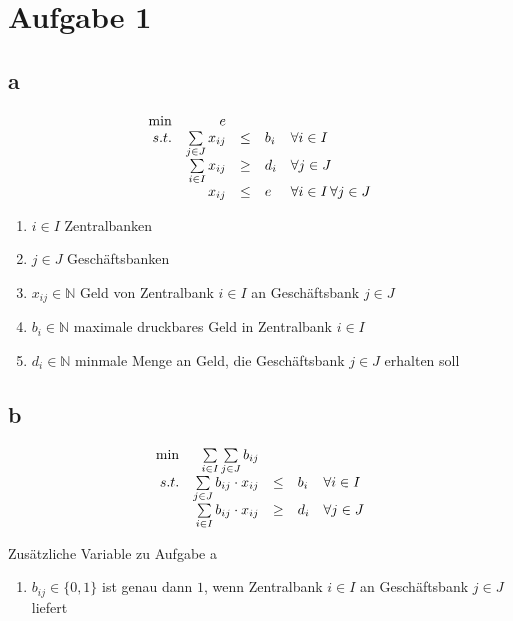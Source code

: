 \documentclass[10pt]{article}
\begin{document}
\section*{Aufgabe 1}
  \subsection*{a}
    \begin{displaymath}
      \begin{array}{ r r c l l}
        \min & e & & & \\
        s.t. & \sum\limits_{j\in J} x_{ij} & \leq & b_i & \forall i\in I \\
             & \sum\limits_{i\in I} x_{ij} & \geq & d_i & \forall j\in J \\
             & x_{ij} & \leq & e & \forall i\in I\, \forall j\in J
      \end{array}
    \end{displaymath}
    \begin{enumerate}
      \item $i\in I$ Zentralbanken
      \item $j\in J$ Geschäftsbanken
      \item $x_{ij}\in \mathbb{N}$ Geld von Zentralbank $i\in I$ 
            an Geschäftsbank $j\in J$
      \item $b_i\in \mathbb{N}$ maximale druckbares Geld in Zentralbank $i\in I$
      \item $d_i\in \mathbb{N}$ minmale Menge an Geld, die Geschäftsbank $j\in J$
            erhalten soll
    \end{enumerate}

  \subsection*{b}
    \begin{displaymath}
      \begin{array}{ r r c l l }
        \min & \sum\limits_{i\in I}\sum\limits_{j\in J} b_{ij} & & & \\
        s.t. & \sum\limits_{j\in J}b_{ij}\cdot x_{ij} & \leq & b_i & \forall i\in I \\
             & \sum\limits_{i\in I}b_{ij}\cdot x_{ij} & \geq & d_i & \forall j\in J \\
      \end{array}
    \end{displaymath}

    Zusätzliche Variable zu Aufgabe a
    \begin{enumerate}
      \item $b_{ij} \in \{0,1\}$ ist genau dann $1$, wenn Zentralbank $i\in I$
        an Geschäftsbank $j\in J$ liefert
    \end{enumerate}
\end{document}

